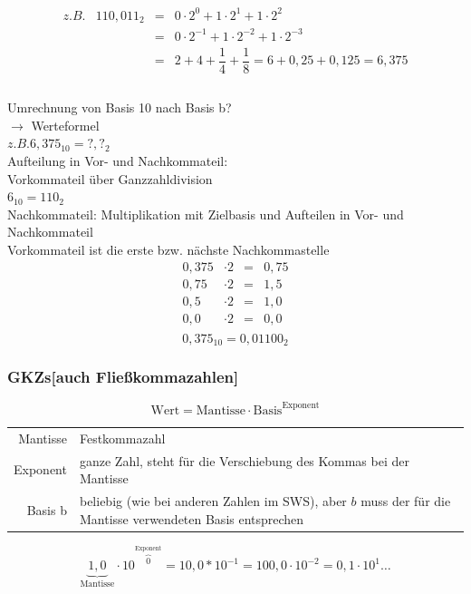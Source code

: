 \documentclass[10pt,a4paper]{scrartcl}
\begin{document}
$$
\begin{array}{rrcl}
z.B. & 110,011_2 & = & 0 \cdot 2^0 + 1 \cdot 2^1 + 1 \cdot 2^2 \\
        &                     & = & 0 \cdot 2^{-1} + 1 \cdot 2^{-2} + 1 \cdot 2^{-3} \\
        &                     & = & 2 + 4 + \dfrac{1}{4} + \dfrac{1}{8} = 6 + 0,25 + 0,125 = 6,375 \\
\end{array}
$$
\\
Umrechnung von Basis 10 nach Basis b? \\
$\rightarrow$ Werteformel\\
$ z.B. 6,375_{10} = ?,?_2 $\\
\noindent
Aufteilung in Vor- und Nachkommateil: \\
Vorkommateil über Ganzzahldivision\\
$ 6_{10} = 110_{2} $\\
Nachkommateil: Multiplikation mit Zielbasis und Aufteilen in Vor- und Nachkommateil \\
Vorkommateil ist die erste bzw. nächste Nachkommastelle
$$
\begin{array}{rlcl}
0,375 & \cdot 2 & = & 0,75\\
0,75   & \cdot 2 & = & 1,5\\
0,5     & \cdot 2 & = & 1,0\\
0,0     & \cdot 2 & = & 0,0\\
\end{array}
$$
$$
0,375_{10} = 0,01100_{2}
$$

\subsubsection{\acfp{GKZ}[auch Fließkommazahlen]}
$$
\text{Wert} = \text{Mantisse} \cdot \text{Basis}^{\text{Exponent}}
$$
\begin{tabular}{rl}
	Mantisse  & Festkommazahl \\
	Exponent & ganze Zahl, steht für die Verschiebung des Kommas bei der Mantisse\\
	Basis b     & beliebig (wie bei anderen Zahlen im \ac{SWS}), aber $b$ muss der für die Mantisse verwendeten Basis entsprechen\\
\end{tabular}

$$
\underbrace{1,0}_{\text{Mantisse}} \cdot 10^{\overbrace{0}^{\text{Exponent}}} = 10,0 * 10^{-1} = 100,0 \cdot 10^{-2} = 0,1 \cdot 10^{1} \ldots
$$
\end{document}
